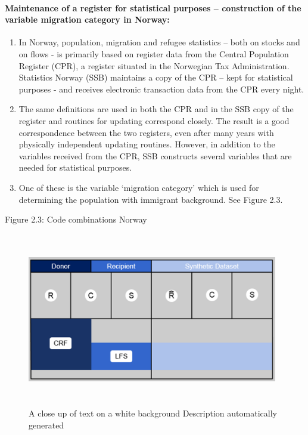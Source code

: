 \documentclass[
]{article}
\begin{document}
\hypertarget{maintenance-of-a-register-for-statistical-purposes-construction-of-the-variable-migration-category-in-norway-1}{%
\paragraph{\texorpdfstring{\textbf{Maintenance of a register for statistical purposes -- construction of the variable migration category in Norway:}}{Maintenance of a register for statistical purposes -- construction of the variable migration category in Norway:}}\label{maintenance-of-a-register-for-statistical-purposes-construction-of-the-variable-migration-category-in-norway-1}}

\begin{enumerate}
\def\labelenumi{\arabic{enumi}.}
\setcounter{enumi}{256}
\item
  In Norway, population, migration and refugee statistics -- both on
  stocks and on flows - is primarily based on register data from the
  Central Population Register (CPR), a register situated in the
  Norwegian Tax Administration. Statistics Norway (SSB) maintains a
  copy of the CPR -- kept for statistical purposes - and receives
  electronic transaction data from the CPR every night.
\item
  The same definitions are used in both the CPR and in the SSB copy
  of the register and routines for updating correspond closely. The
  result is a good correspondence between the two registers, even
  after many years with physically independent updating routines.
  However, in addition to the variables received from the CPR, SSB
  constructs several variables that are needed for statistical
  purposes.
\item
  One of these is the variable `migration category' which is used for
  determining the population with immigrant background. See Figure
  2.3.
\end{enumerate}

Figure 2.3: Code combinations Norway

\begin{figure}
\centering
\includegraphics[width=4.31181in,height=2.98681in]{media/image26.png}
\caption{A close up of text on a white background Description automatically
generated}
\end{figure}
\end{document}
